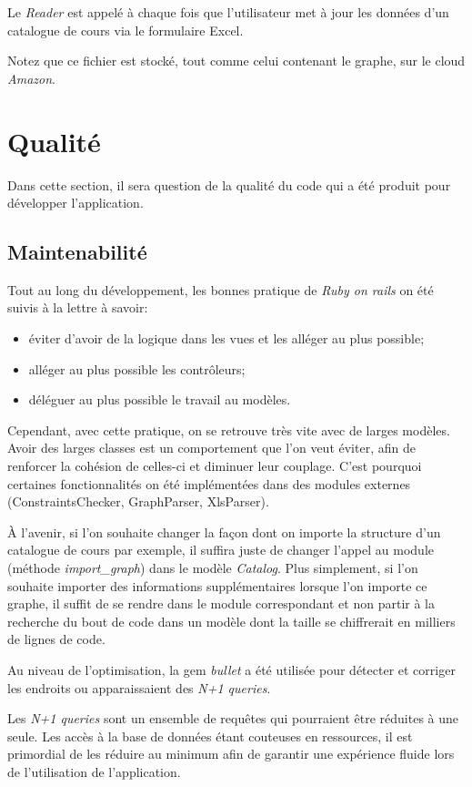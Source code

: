 Le \textit{Reader} est appelé à chaque fois que l'utilisateur met à jour les données d'un catalogue de cours via le formulaire Excel. 


Notez que ce fichier est stocké, tout comme celui contenant le graphe, sur le cloud \textit{Amazon}.
\section{Qualité}
Dans cette section, il sera question de la qualité du code qui a été produit pour développer l'application. 

\subsection{Maintenabilité}

Tout au long du développement, les bonnes pratique de \textit{Ruby on rails} on été suivis à la lettre à savoir:
\begin{itemize}
\item éviter d'avoir de la logique dans les vues et les alléger au plus possible;
\item alléger au plus possible les contrôleurs;
\item déléguer au plus possible le travail au modèles.
\end{itemize}

Cependant, avec cette pratique, on se retrouve très vite avec de larges modèles. Avoir des larges classes est un comportement que l'on veut éviter, afin de renforcer la cohésion de celles-ci et diminuer leur couplage. C'est pourquoi certaines fonctionnalités on été implémentées dans des modules externes (ConstraintsChecker, GraphParser, XlsParser).

À l'avenir, si l'on souhaite changer la façon dont on importe la structure d'un catalogue de cours par exemple, il suffira juste de changer l'appel au module (méthode \textit{import\_graph}) dans le modèle \textit{Catalog}. Plus simplement, si l'on souhaite importer des informations supplémentaires lorsque l'on importe ce graphe, il suffit de se rendre dans le module correspondant et non partir à la recherche du bout de code dans un modèle dont la taille se chiffrerait en milliers de lignes de code.

Au niveau de l'optimisation, la gem \textit{bullet} a été utilisée pour détecter et corriger les endroits ou apparaissaient des \textit{N+1 queries}. 

Les \textit{N+1 queries} sont un ensemble de requêtes qui pourraient être réduites à une seule. Les accès à la base de données étant couteuses en ressources, il est primordial de les réduire au minimum afin de garantir une expérience fluide lors de l'utilisation de l'application. 

